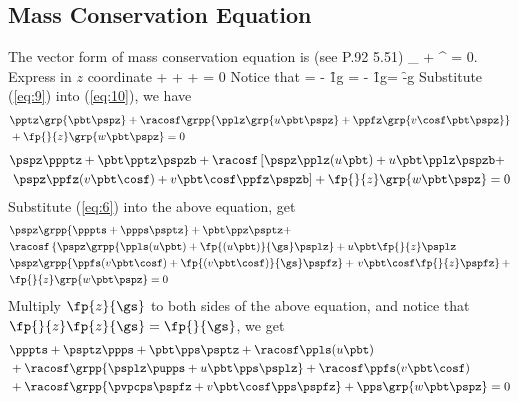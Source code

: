 \subsection{Mass Conservation Equation}
\label{der:mass-sig}

The vector form of mass conservation equation is (see
\citet{Yang1982_book}{P.92 5.51})
\beeq
{}_ + 
\overbrace{ \gn \cdot (\rho \vv) }^ = 0.
\eneq
Express in $z$ coordinate 
\beeq \label{eq:10}
 + \racosf {} + \racosf {} +
 = 0
\eneq
Notice that
\beeq \label{eq:9}
\rho = - \f{1}{g} = - \f{1}{g}\pspz = -\f{\pbt}{g}\pspz
\eneq
Substitute (\ref{eq:9}) into (\ref{eq:10}), we have
\begin{align}
  &\pptz\grp{\pbt\pspz} + 
  \racosf\grpp{ \pplz\grp{u\pbt \pspz}+\ppfz\grp{v\cosf \pbt\pspz} } 
  \notag\\
  &+ \fp{}{z}\grp{w\pbt \pspz} = 0
\end{align}
\begin{align}
  &\pspz \ppptz + \pbt \pptz \pspzb + 
  \racosf \left[ \pspz \pplz (u\pbt) + u\pbt\pplz \pspzb +\right. \notag\\
  &\left. \pspz \ppfz(v\pbt \cosf) + v\pbt \cosf\ppfz\pspzb \right] 
    +\fp{}{z}\grp{ w\pbt \pspz } = 0
\end{align}
Substitute (\ref{eq:6}) into the above equation, get
\begin{align}
  &\pspz \grpp{ \pppts + \ppps \psptz } + \pbt \ppz \psptz + \notag\\
  &\racosf \left\{ \pspz \grpp{ \ppls(u\pbt)+\fp{(u\pbt)}{\gs}\psplz } +
  u\pbt\fp{}{z}\psplz \right. \notag\\
  &\pspz\grpp{ \ppfs(v\pbt\cosf)+\fp{(v\pbt\cosf)}{\gs}\pspfz } +
\left. v\pbt\cosf\fp{}{z}\pspfz \right\}+\notag\\
&\fp{}{z}\grp{w\pbt\pspz} = 0
\end{align}
Multiply $\fp{z}{\gs}$ to both sides of the above equation, and notice that
$\fp{}{z} \fp{z}{\gs} = \fp{}{\gs}$, we get
\begin{align}
  &\pppts + \psptz \ppps + \pbt\pps\psptz + \racosf \ppls(u\pbt) \notag\\
  &+\racosf \grpp{ \psplz\pupps + u\pbt\pps\psplz } + \racosf \ppfs(v\pbt\cosf) \notag\\
  &+\racosf \grpp{ \pvpcps\pspfz + v\pbt\cosf\pps\pspfz } + \pps\grp{w\pbt\pspz} = 0
\end{align}
